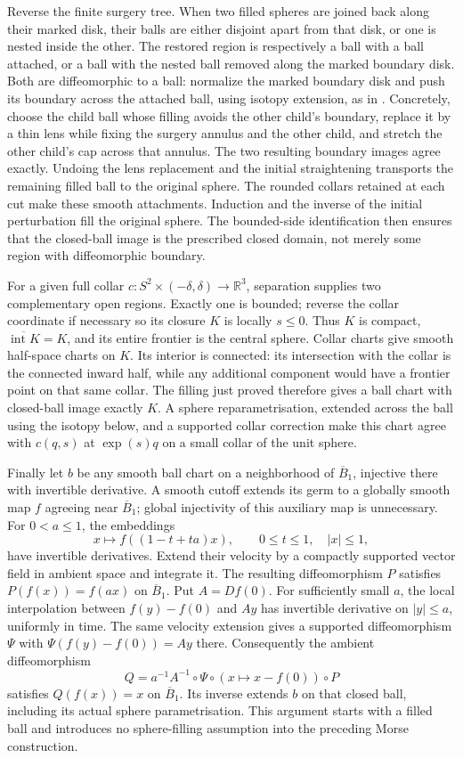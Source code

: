 Reverse the finite surgery tree.  When two filled spheres are joined
back along their marked disk, their balls are either disjoint apart
from that disk, or one is nested inside the other.  The restored region
is respectively a ball with a ball attached, or a ball with the nested
ball removed along the marked boundary disk.  Both are diffeomorphic
to a ball: normalize the marked boundary disk and push its boundary
across the attached ball, using isotopy extension, as in
\cite[Lemma 1.3, p.~5]{Hatcher3M2014}.  Concretely, choose the child
ball whose filling avoids the other child's boundary, replace it by a
thin lens while fixing the surgery annulus and the other child, and
stretch the other child's cap across that annulus.  The two resulting
boundary images agree exactly.  Undoing the lens replacement and the
initial straightening transports the remaining filled ball to the
original sphere.  The rounded collars retained
at each cut make these smooth attachments.  Induction and the inverse
of the initial perturbation fill the original sphere.  The bounded-side
identification then ensures that the closed-ball image is the prescribed
closed domain, not merely some region with diffeomorphic boundary.

For a given full collar $c:S^2\times(-\delta,\delta)\to\mathbb R^3$,
separation supplies two complementary open regions.  Exactly one is
bounded; reverse the collar coordinate if necessary so its closure $K$
is locally $s\le0$.  Thus $K$ is compact,
$\overline{\operatorname{int}K}=K$, and its entire frontier is the
central sphere.  Collar charts give smooth half-space charts on $K$.
Its interior is connected: its intersection with the collar is the
connected inward half, while any additional component would have a
frontier point on that same collar.  The filling just proved therefore
gives a ball chart with closed-ball image exactly $K$.  A sphere
reparametrisation, extended across the ball using the isotopy below,
and a supported collar correction make this chart agree with
$c(q,s)$ at $\exp(s)q$ on a small collar of the unit sphere.

Finally let $b$ be any smooth ball chart on a neighborhood of
$\overline B_1$, injective there with invertible derivative.  A smooth
cutoff extends its germ to a globally smooth map $f$ agreeing near
$\overline B_1$; global injectivity of this auxiliary map is unnecessary.
For $0<a\le1$, the embeddings
\[
 x\longmapsto f((1-t+ta)x),\qquad 0\le t\le1,\quad |x|\le1,
\]
have invertible derivatives.  Extend their velocity by a compactly
supported vector field in ambient space and integrate it.  The resulting
diffeomorphism $P$ satisfies $P(f(x))=f(ax)$ on $\overline B_1$.
Put $A=Df(0)$.  For sufficiently small $a$, the local interpolation
between $f(y)-f(0)$ and $Ay$ has invertible derivative on $|y|\le a$,
uniformly in time.  The same velocity extension gives a supported
diffeomorphism $\Psi$ with
$\Psi(f(y)-f(0))=Ay$ there.  Consequently the ambient diffeomorphism
\[
 Q=a^{-1}A^{-1}\circ\Psi\circ (x\mapsto x-f(0))\circ P
\]
satisfies $Q(f(x))=x$ on $\overline B_1$.  Its inverse extends $b$
on that closed ball, including its actual sphere parametrisation.
This argument starts with a filled ball and introduces no sphere-filling
assumption into the preceding Morse construction.

